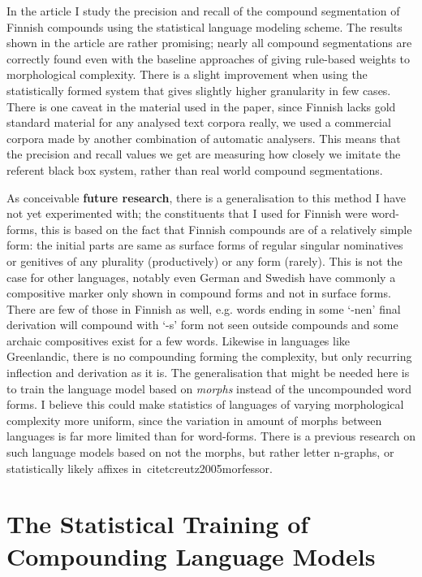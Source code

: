 \documentclass[officiallayout]{unihelcompling}
\begin{document}
In the article I study the precision and recall of the compound segmentation
of Finnish compounds using the statistical language modeling scheme. The
results shown in the article are rather promising; nearly all compound
segmentations are correctly found even with the baseline approaches of giving
rule-based weights to morphological complexity. There is a slight improvement
when using the statistically formed system that gives slightly higher
granularity in few cases. There is one caveat in the material used in the
paper, since Finnish lacks gold standard material for any analysed text
corpora really, we used a commercial corpora made by another combination
of automatic analysers. This means that the precision and recall values we
get are measuring how closely we imitate the referent black box system, rather
than real world compound segmentations.

As conceivable \textbf{future research}, there is a generalisation to this
method I have not yet experimented with; the constituents that I used for
Finnish were word-forms, this is based on the fact that Finnish compounds are
of a relatively simple form: the initial parts are same as surface forms of
regular singular nominatives or genitives of any plurality (productively) or
any form (rarely). This is not the case for other languages, notably even
German and Swedish have commonly a compositive marker only shown in compound
forms and not in surface forms. There are few of those in Finnish as well,
e.g.\/ words ending in some `-nen' final derivation will compound with `-s'
form not seen outside compounds and some archaic compositives exist for a few
words.  Likewise in languages like Greenlandic, there is no compounding forming
the complexity, but only recurring inflection and derivation as it is. The
generalisation that might be needed here is to train the language model based
on \emph{morphs} instead of the uncompounded word forms.  I believe this could
make statistics of languages of varying morphological complexity more uniform,
since the variation in amount of morphs between languages is far more limited
than for word-forms. There is a previous research on such language models based
on not the morphs, but rather letter n-graphs, or statistically likely affixes
in~citet{creutz2005morfessor}.

\section{The Statistical Training of Compounding Language Models}
\label{sec:training-compounds}
\end{document}
